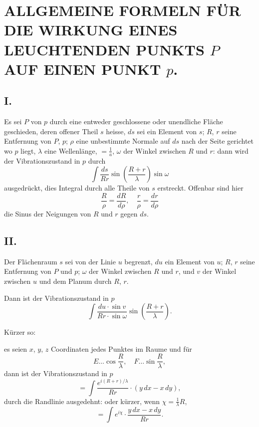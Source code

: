 \documentclass[fontsize=10pt,paper=a5,pagesize=auto]{scrbook}
\newcommand{\origpage}[1]{\marginpar{\footnotesize\textit{S. #1}}}
\begin{document}
\newpage
\section*{ALLGEMEINE FORMELN FÜR DIE WIRKUNG EINES LEUCHTENDEN PUNKTS $P$ AUF EINEN PUNKT $p$.}
\label{sec:leuchtender-punkt}

\subsection*{I.}
\origpage{642}
Es sei $P$ von $p$ durch eine entweder geschlossene oder unendliche Fläche geschieden, deren offener Theil $s$ heisse, $ds$ sei ein Element von $s$; $R$, $r$ seine Entfernung von $P$, $p$; $\rho$ eine unbestimmte Normale auf $ds$ nach der Seite gerichtet wo $p$ liegt, $\lambda$ eine Wellenlänge, $= \frac{1}{a}$, $\omega$ der Winkel zwischen $R$ und $r$: dann wird der Vibrationszustand in $p$ durch
\[
\int \frac{ds}{Rr} \sin\left(\frac{R + r}{\lambda}\right) \sin\omega
\]
ausgedrückt, dies Integral durch alle Theile von $s$ erstreckt. Offenbar sind hier
\[
\frac{R}{\rho} = \frac{dR}{d\rho}, \quad \frac{r}{\rho} = \frac{dr}{d\rho}
\]
die Sinus der Neigungen von $R$ und $r$ gegen $ds$.

\subsection*{II.}
\origpage{643}
Der Flächenraum $s$ sei von der Linie $u$ begrenzt, $du$ ein Element von $u$; $R$, $r$ seine Entfernung von $P$ und $p$; $\omega$ der Winkel zwischen $R$ und $r$, und $v$ der Winkel zwischen $u$ und dem Planum durch $R$, $r$.

Dann ist der Vibrationszustand in $p$
\[
\int \frac{du \cdot \sin v}{Rr \cdot \sin\omega} \sin\left(\frac{R + r}{\lambda}\right).
\]

Kürzer so:

es seien $x$, $y$, $z$ Coordinaten jedes Punktes im Raume und für
\[
E\dots\cos\frac{R}{\lambda}, \quad F\dots\sin\frac{R}{\lambda},
\]
dann ist der Vibrationszustand in $p$
\[
= \int \frac{e^{i(R + r)/\lambda}}{Rr} \cdot (y \, dx - x \, dy),
\]
durch die Randlinie ausgedehnt: oder kürzer, wenn $\chi = \frac{1}{\lambda}R$,
\[
= \int e^{i\chi} \cdot \frac{y \, dx - x \, dy}{Rr}.
\]

\newpage
\end{document}
